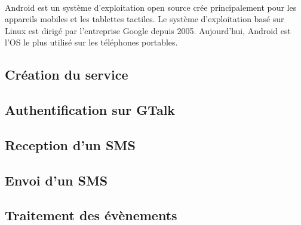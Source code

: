 \paragraph{}
Android est un système d'exploitation open source crée principalement pour les appareils mobiles et 
les tablettes tactiles. Le système d'exploitation basé sur Linux est dirigé par l'entreprise Google
depuis 2005. 
Aujourd'hui, Android est l'OS le plus utilisé sur les téléphones portables.



\subsection{Création du service}


\subsection{Authentification sur GTalk}


\subsection{Reception d'un SMS}


\subsection{Envoi d'un SMS}


\subsection{Traitement des évènements}
\\



